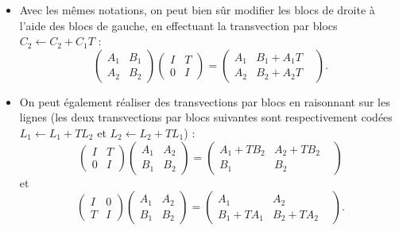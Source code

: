 \documentclass[french]{article}
\theoremstyle{plain}
\theoremstyle{definition}
\theoremstyle{remark}
\begin{document}
\begin{itemize}
	On peut, si l'on veut, "coder" la transvection par blocs avec des transvections "classiques" : si l'on a $T=(t_{i,j})_{(i,j)\in\llbracket1,n\rrbracket\times\llbracket1,p\rrbracket}$, alors la matrice $\begin{pmatrix}
		A_1+B_1T&B_1\\
		A_2+B_2T&B_2
	\end{pmatrix}$ est obtenue, à partir de $M$, appliquant les transvections suivantes (dont on voit aisément qu'elles commutent) :
	$$C_i\leftarrow C_i+t_{j,i}C_{j+n}\quad\text{avec}\quad(i,j)\in\llbracket1,n\rrbracket\times\llbracket1,p\rrbracket.$$
	La lourdeur de cette chaîne de transvections met en exergue l'efficacité et la concision apportée par l'utilisation des blocs.
	\item Avec les mêmes notations, on peut bien sûr modifier les blocs de droite à l'aide des blocs de gauche, en effectuant la transvection par blocs $C_2\leftarrow C_2+C_1T$ :
	$$\begin{pmatrix}
		A_1&B_1\\
		A_2&B_2
	\end{pmatrix}\begin{pmatrix}
		I&T\\
		0&I
	\end{pmatrix}=\begin{pmatrix}
		A_1&B_1+A_1T&\\
		A_2&B_2+A_2T
	\end{pmatrix}.$$
	\item On peut également réaliser des transvections par blocs en raisonnant sur les lignes (les deux transvections par blocs suivantes sont respectivement codées $L_1\leftarrow L_1+TL_2$ et $L_2\leftarrow L_2+TL_1$) :
	$$\begin{pmatrix}
		I&T\\
		0&I
	\end{pmatrix}\begin{pmatrix}
		A_1&A_2\\
		B_1&B_2
	\end{pmatrix}=\begin{pmatrix}
		A_1+TB_2&A_2+TB_2&\\
		B_1&B_2
	\end{pmatrix}$$
	et
	$$\begin{pmatrix}
		I&0\\
		T&I
	\end{pmatrix}\begin{pmatrix}
		A_1&A_2\\
		B_1&B_2
	\end{pmatrix}=\begin{pmatrix}
		A_1&A_2&\\
		B_1+TA_1&B_2+TA_2
	\end{pmatrix}.$$
\end{itemize}
\end{document}
